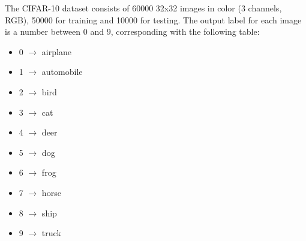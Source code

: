 The CIFAR-10 dataset consists of 60000 32x32 images in color (3 channels, RGB),
50000 for training and 10000 for testing. The output label for each image is a number
between 0 and 9, corresponding with the following table:
\begin{center}
    \begin{multicols}{2}
        \begin{itemize}
            \item 0 $\rightarrow$ airplane 
            \item 1 $\rightarrow$ automobile
            \item 2 $\rightarrow$ bird
            \item 3 $\rightarrow$ cat
            \item 4 $\rightarrow$ deer
            \item 5 $\rightarrow$ dog
            \item 6 $\rightarrow$ frog
            \item 7 $\rightarrow$ horse
            \item 8 $\rightarrow$ ship
            \item 9 $\rightarrow$ truck
        \end{itemize}
    \end{multicols}
\end{center}
